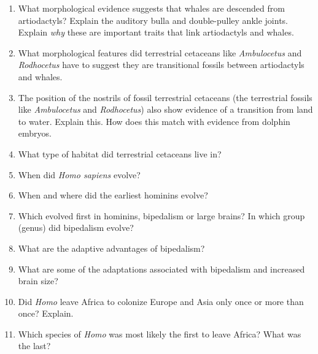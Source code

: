 \documentclass[letterpaper]{tufte-handout}
\begin{document}
\begin{enumerate}

	\item What morphological evidence suggests that whales are descended from artiodactyls? Explain the auditory bulla and double-pulley ankle joints. Explain \emph{why} these are important traits that link artiodactyls and whales.
	
	\item What morphological features  did terrestrial cetaceans like \textit{Ambulocetus} and \textit{Rodhocetus} have to suggest they are transitional fossils between artiodactyls and whales.
	
	\item The position of the nostrils of fossil terrestrial cetaceans (the terrestrial fossils like \textit{Ambulocetus} and \textit{Rodhocetus}) also show evidence of a transition from land to water. Explain this. How does this match with evidence from dolphin embryos.
	
	\item What type of habitat did terrestrial cetaceans live in?
	
	\item When did \textit{Homo sapiens} evolve?
	
	\item When and where did the earliest hominins evolve?
	
	\item Which evolved first in hominins, bipedalism or large brains? In which group (genus) did bipedalism evolve?
	
	\item What are the adaptive advantages of bipedalism?
	
	\item What are some of the adaptations associated with bipedalism and increased brain size?
	
	\item Did \textit{Homo} leave Africa to colonize Europe and Asia only once or more than once?  Explain.
	
	\item Which species of \textit{Homo} was most likely the first to leave Africa? What was the last?
	

\end{enumerate}
\end{document}
